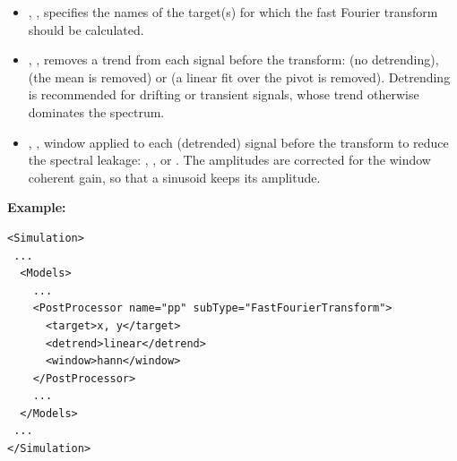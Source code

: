 %
\begin{itemize}
  \item {}, , specifies the names of the
    target(s) for which the fast Fourier transform should be calculated.
  \item {}, , removes a trend from each signal before the transform:
     (no detrending),  (the mean is removed) or  (a linear fit
    over the pivot is removed). Detrending is recommended for drifting or transient signals, whose trend otherwise
    dominates the spectrum.
  \item {}, , window applied to each (detrended) signal before the
    transform to reduce the spectral leakage: , ,  or
    . The amplitudes are corrected for the window coherent gain, so that a sinusoid keeps its
    amplitude.
 \end{itemize}
\textbf{Example:}

\begin{lstlisting}[style=XML]
<Simulation>
 ...
  <Models>
    ...
    <PostProcessor name="pp" subType="FastFourierTransform">
      <target>x, y</target>
      <detrend>linear</detrend>
      <window>hann</window>
    </PostProcessor>
    ...
  </Models>
 ...
</Simulation>
\end{lstlisting}

